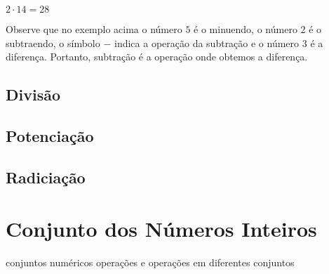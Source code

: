 \begin{example}
    $2 \cdot 14=28$
\end{example}

Observe que no exemplo acima o número $5$ é o minuendo, o número $2$ é o subtraendo, o símbolo $-$ indica a operação da subtração e o número $3$ é a diferença. Portanto, subtração é a operação onde obtemos a diferença.

\subsection{Divisão}


\subsection{Potenciação}


\subsection{Radiciação}

\subsection{}


\section{Conjunto dos Números Inteiros}
conjuntos numéricos
operações e 
operações em diferentes conjuntos

